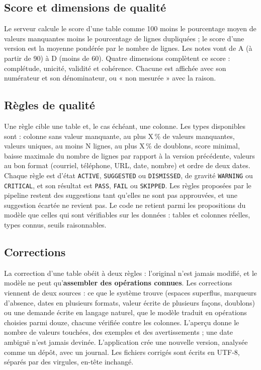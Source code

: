 \subsection{Score et dimensions de qualité}

Le serveur calcule le score d'une table comme 100 moins le pourcentage moyen de valeurs manquantes moins le pourcentage de lignes dupliquées ; le score d'une version est la moyenne pondérée par le nombre de lignes. Les notes vont de A (à partir de 90) à D (moins de 60). Quatre dimensions complètent ce score : complétude, unicité, validité et cohérence. Chacune est affichée avec son numérateur et son dénominateur, ou « non mesurée » avec la raison.

\subsection{Règles de qualité}

Une règle cible une table et, le cas échéant, une colonne. Les types disponibles sont : colonne sans valeur manquante, au plus X\,\% de valeurs manquantes, valeurs uniques, au moins N lignes, au plus X\,\% de doublons, score minimal, baisse maximale du nombre de lignes par rapport à la version précédente, valeurs au bon format (courriel, téléphone, URL, date, nombre) et ordre de deux dates. Chaque règle est d'état \texttt{ACTIVE}, \texttt{SUGGESTED} ou \texttt{DISMISSED}, de gravité \texttt{WARNING} ou \texttt{CRITICAL}, et son résultat est \texttt{PASS}, \texttt{FAIL} ou \texttt{SKIPPED}. Les règles proposées par le pipeline restent des suggestions tant qu'elles ne sont pas approuvées, et une suggestion écartée ne revient pas. Le code ne retient parmi les propositions du modèle que celles qui sont vérifiables sur les données : tables et colonnes réelles, types connus, seuils raisonnables.

\subsection{Corrections}

La correction d'une table obéit à deux règles : l'original n'est jamais modifié, et le modèle ne peut qu'\textbf{assembler des opérations connues}. Les corrections viennent de deux sources : ce que le système trouve (espaces superflus, marqueurs d'absence, dates en plusieurs formats, valeur écrite de plusieurs façons, doublons) ou une demande écrite en langage naturel, que le modèle traduit en opérations choisies parmi douze, chacune vérifiée contre les colonnes. L'aperçu donne le nombre de valeurs touchées, des exemples et des avertissements ; une date ambiguë n'est jamais devinée. L'application crée une nouvelle version, analysée comme un dépôt, avec un journal. Les fichiers corrigés sont écrits en UTF-8, séparés par des virgules, en-tête inchangé.

